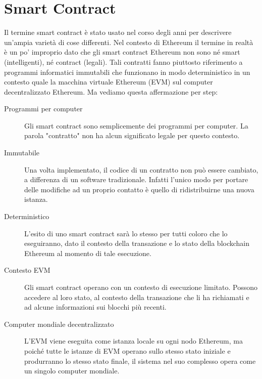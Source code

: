 \section{Smart Contract}
Il termine smart contract è stato usato nel corso degli anni per descrivere un'ampia varietà di cose differenti. Nel contesto di Ethereum il termine in realtà è un po' improprio dato che gli smart contract Ethereum non sono né smart (intelligenti), né contract (legali). Tali contratti fanno piuttosto riferimento a programmi informatici immutabili che funzionano in modo deterministico in un contesto quale la macchina virtuale Ethereum (EVM) sul computer decentralizzato Ethereum. Ma vediamo questa affermazione per step:
\begin{description}
	\item[Programmi per computer] Gli smart contract sono semplicemente dei programmi per computer. La parola "contratto" non ha alcun significato legale per questo contesto.
	\item[Immutabile] Una volta implementato, il codice di un contratto non può essere cambiato, a differenza di un software tradizionale. Infatti l'unico modo per portare delle modifiche ad un proprio contatto è quello di ridistribuirne una nuova istanza.
	\item[Deterministico] L'esito di uno smart contract sarà lo stesso per tutti coloro che lo eseguiranno, dato il contesto della transazione e lo stato della blockchain Ethereum al momento di tale esecuzione.
	\item[Contesto EVM] Gli smart contract operano con un contesto di esecuzione limitato. Possono accedere al loro stato, al contesto della transazione che li ha richiamati e ad alcune informazioni sui blocchi più recenti.
	\item[Computer mondiale decentralizzato] L'EVM viene eseguita come istanza locale su ogni nodo Ethereum, ma poiché tutte le istanze di EVM operano sullo stesso stato iniziale e produrranno lo stesso stato finale, il sistema nel suo complesso opera come un singolo computer mondiale.
\end{description}
%

